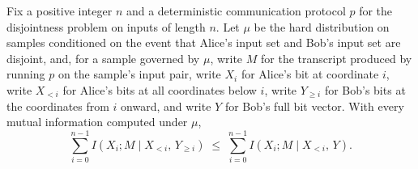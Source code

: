 \begin{theorem}
\label{CommunicationComplexity.Functions.Disjointness.RandomizedLowerBound.sum_fixedAliceInfoTerm_le_sum_fixedAliceFullYInfoTerm}
\leanok
{}
Fix a positive integer $n$ and a deterministic communication protocol $p$ for the
disjointness problem on inputs of length $n$. Let $\mu$ be the hard distribution on
samples conditioned on the event that Alice's input set and Bob's input set are
disjoint, and, for a sample governed by $\mu$, write $M$ for the transcript produced by
running $p$ on the sample's input pair, write $X_i$ for Alice's bit at coordinate $i$,
write $X_{<i}$ for Alice's bits at all coordinates below $i$, write $Y_{\ge i}$ for
Bob's bits at the coordinates from $i$ onward, and write $Y$ for Bob's full bit vector.
With every mutual information computed under $\mu$,
\[
\sum_{i=0}^{n-1} I\!\left(X_i ; M \mid X_{<i},\, Y_{\ge i}\right) \;\le\;
\sum_{i=0}^{n-1} I\!\left(X_i ; M \mid X_{<i},\, Y\right).
\]
\end{theorem}


